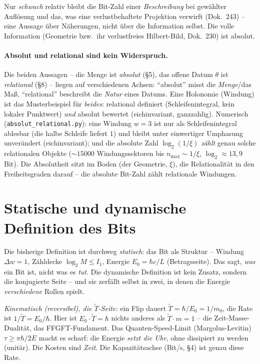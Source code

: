 Nur \emph{schwach} relativ bleibt die Bit-Zahl einer \emph{Beschreibung} bei gewählter Auflösung und das,
was eine verlustbehaftete Projektion verwirft (Dok.~243) -- eine Aussage über Näherungen, nicht über die
Information selbst. Die volle Information (Geometrie bzw.\ ihr verlustfreies Hilbert-Bild, Dok.~230) ist
absolut.

\paragraph{Absolut und relational sind kein Widerspruch.} Die beiden Aussagen -- die Menge ist
\emph{absolut} (§5), das offene Datum $\theta$ ist \emph{relational} (§8) -- liegen auf verschiedenen
Achsen: \enquote{absolut} misst die \emph{Menge}/das Maß, \enquote{relational} beschreibt die
\emph{Natur} eines Datums. Eine Holonomie (Windung) ist das Musterbeispiel für \emph{beides}: relational
definiert (Schleifenintegral, kein lokaler Punktwert) \emph{und} absolut bewertet (eichinvariant,
ganzzahlig). Numerisch (\texttt{absolut\_relational.py}): eine Windung $w=3$ ist nur als Schleifenintegral
ablesbar (die halbe Schleife liefert $1$) und bleibt unter einwertiger Umphasung unverändert
(eichinvariant); und die absolute Zahl $\log_2(1/\xi)$ \emph{zählt} genau solche relationalen Objekte
($\sim15000$ Windungssektoren bis $n_\text{max}\sim1/\xi$, $\log_2\approx13{,}9$ Bit). Die Absolutheit
sitzt im Boden (der Geometrie, $\xi$), die Relationalität in den Freiheitsgraden darauf -- die absolute
Bit-Zahl zählt relationale Windungen.

\section{Statische und dynamische Definition des Bits}
Die bisherige Definition ist durchweg \emph{statisch}: das Bit als Struktur -- Windung $\Delta w=1$,
Zähldecke $\log_2 M\le I_1$, Energie $E_0=\hbar c/L$ (Betragsseite). Das sagt, \emph{was} ein Bit ist,
nicht was es \emph{tut}. Die dynamische Definition ist kein Zusatz, sondern die konjugierte Seite -- und
sie zerfällt selbst in zwei, in denen die Energie \emph{verschiedene} Rollen spielt.

\emph{Kinematisch (reversibel), die $\tilde T$-Seite:} ein Flip dauert $\tilde T=\hbar/E_0=1/m_0$, die Rate
ist $1/\tilde T=E_0/\hbar$. Hier ist $E_0\cdot\tilde T=\hbar$ nichts anderes als $\tilde T\cdot m=1$ -- die
Zeit-Masse-Dualität, das FFGFT-Fundament. Das Quanten-Speed-Limit (Margolus-Levitin) $\tau\ge\pi\hbar/2E$
macht es scharf: die Energie \emph{setzt die Uhr}, ohne dissipiert zu werden (unitär). Die Kosten sind
\emph{Zeit}. Die Kapazitätsachse (Bit/s, §4) ist genau diese Rate.

